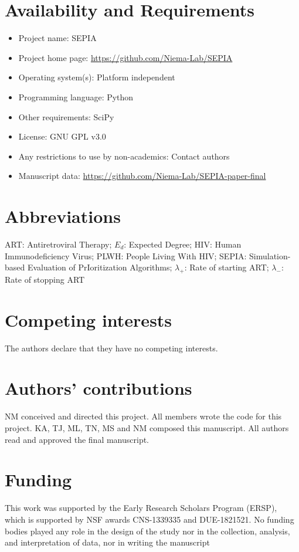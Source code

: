 \documentclass[twocolumn]{bmcart}%
\begin{document}
\begin{backmatter}
\section*{Availability and Requirements}
\begin{itemize}
\item Project name: SEPIA
\item Project home page: \href{https://github.com/Niema-Lab/SEPIA}{https://github.com/Niema-Lab/SEPIA}
\item Operating system(s): Platform independent
\item Programming language: Python
\item Other requirements: SciPy
\item License: GNU GPL v3.0
\item Any restrictions to use by non-academics: Contact authors
\item Manuscript data: \href{https://github.com/Niema-Lab/SEPIA-paper-final}{https://github.com/Niema-Lab/SEPIA-paper-final}
\end{itemize}

\section*{Abbreviations}
ART: Antiretroviral Therapy;
$E_d$: Expected Degree;
HIV: Human Immunodeficiency Virus;
PLWH: People Living With HIV;
SEPIA: Simulation-based Evaluation of PrIoritization Algorithms;
$\lambda_+$: Rate of starting ART;
$\lambda_-$: Rate of stopping ART

\section*{Competing interests}
The authors declare that they have no competing interests.

\section*{Authors' contributions}
NM conceived and directed this project. All members wrote the code for this project. KA, TJ, ML, TN, MS and NM composed this manuscript. All authors read and approved the final manuscript.

\section*{Funding}
This work was supported by the Early Research Scholars Program (ERSP), which is supported by NSF awards CNS-1339335 and DUE-1821521. No funding bodies played any role in the design of the study nor in the collection, analysis, and interpretation of data, nor in writing the manuscript
    

\end{backmatter}
\end{document}
